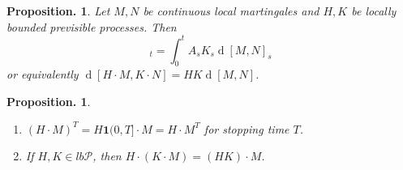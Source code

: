 \documentclass[11pt, a4paper]{memoir}
\theoremstyle{change}
\newtheorem{proposition}[theorem]{Proposition.}
\theoremstyle{plain}
\theoremstyle{nonumberplain}
\renewcommand{\d}[1]{\ensuremath{\operatorname{d}\!{#1}}}
\newcommand{\idc}{\mathbf{1}}
\numberwithin{equation}{section}
\begin{document}
\begin{proposition}
    Let $M,N$ be continuous local martingales and $H,K$ be locally bounded previsible processes.
    Then
    \begin{equation*}
        [H\cdot M,K\cdot N]_t = \int_0^t A_sK_s\d{[M,N]_s}
    \end{equation*}
    or equivalently $\d{[H\cdot M,K\cdot N]}=HK\d{[M,N]}$.
\end{proposition}
\begin{proposition}
    \begin{enumerate}[nl]
        \item $(H\cdot M)^T=H\idc{(0,T]}\cdot M=H\cdot M^T$ for stopping time $T$.
        \item If $H,K\in lb\mathcal{P}$, then $H\cdot(K\cdot M)=(HK)\cdot M$.
    \end{enumerate}
\end{proposition}
\end{document}
